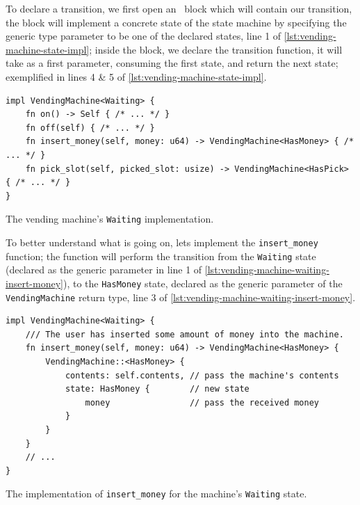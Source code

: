 To declare a transition, we first open an \footnotemark~block which will contain our transition,
the block will implement a concrete state of the state machine by specifying the generic type parameter to be one of the declared states, line 1 of \autoref{lst:vending-machine-state-impl};
inside the block, we declare the transition function, it will take  as a first parameter, consuming the first state, and return the next state;
exemplified in lines 4 \& 5 of \autoref{lst:vending-machine-state-impl}.

\begin{listing}
    \begin{verbatim}
impl VendingMachine<Waiting> {
    fn on() -> Self { /* ... */ }
    fn off(self) { /* ... */ }
    fn insert_money(self, money: u64) -> VendingMachine<HasMoney> { /* ... */ }
    fn pick_slot(self, picked_slot: usize) -> VendingMachine<HasPick> { /* ... */ }
}
\end{verbatim}
    \caption[test]{The vending machine's \texttt{Waiting} implementation\footnotemark.} %
    \label{lst:vending-machine-state-impl}
\end{listing}

To better understand what is going on, lets implement the \texttt{insert\_money} function;
the function will perform the transition from the \textcolor{structblue}{\texttt{Waiting}} state (declared as the generic parameter in line 1 of \autoref{lst:vending-machine-waiting-insert-money}),
to the \textcolor{structblue}{\texttt{HasMoney}} state, declared as the generic parameter of the \textcolor{structblue}{\texttt{VendingMachine}} return type, line 3 of \autoref{lst:vending-machine-waiting-insert-money}.

\begin{listing}
    \begin{verbatim}
impl VendingMachine<Waiting> {
    /// The user has inserted some amount of money into the machine.
    fn insert_money(self, money: u64) -> VendingMachine<HasMoney> {
        VendingMachine::<HasMoney> {
            contents: self.contents, // pass the machine's contents
            state: HasMoney {        // new state
                money                // pass the received money
            }
        }
    }
    // ...
}
\end{verbatim}
    \caption{The implementation of \texttt{insert\_money} for the machine's \texttt{Waiting} state.}
    \label{lst:vending-machine-waiting-insert-money}
\end{listing}

